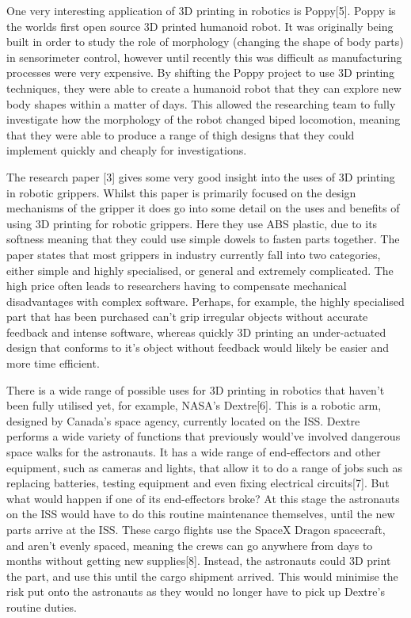 \documentclass{l4proj}
\begin{document}
One very interesting application of 3D printing in robotics is Poppy[5]. Poppy is the worlds first open source 3D printed humanoid robot. It was originally being built in order to study the role of morphology (changing the shape of body parts) in sensorimeter control, however until recently this was difficult as manufacturing processes were very expensive. By shifting the Poppy project to use 3D printing techniques, they were able to create a humanoid robot that they can explore new body shapes within a matter of days. This allowed the researching team to fully investigate how the morphology of the robot changed biped locomotion, meaning that they were able to produce a range of thigh designs that they could implement quickly and cheaply for investigations.

The research paper [3] gives some very good insight into the uses of 3D printing in robotic grippers. Whilst this paper is primarily focused on the design mechanisms of the gripper it does go into some detail on the uses and benefits of using 3D printing for robotic grippers. Here they use ABS plastic, due to its softness meaning that they could use simple dowels to fasten parts together. The paper states that most grippers in industry currently fall into two categories, either simple and highly specialised, or general and extremely complicated. The high price often leads to researchers having to compensate mechanical disadvantages with complex software. Perhaps, for example, the highly specialised part that has been purchased can't grip irregular objects without accurate feedback and intense software, whereas quickly 3D printing an under-actuated design that conforms to it's object without feedback would likely be easier and more time efficient. 

There is a wide range of possible uses for 3D printing in robotics that haven't been fully utilised yet, for example, NASA's Dextre[6]. This is a robotic arm, designed by Canada's space agency, currently located on the ISS. Dextre performs a wide variety of functions that previously would've involved dangerous space walks for the astronauts. It has a wide range of end-effectors and other equipment, such as cameras and lights, that allow it to do a range of jobs such as replacing batteries, testing equipment and even fixing electrical circuits[7]. But what would happen if one of its end-effectors broke? At this stage the astronauts on the ISS would have to do this routine maintenance themselves, until the new parts arrive at the ISS. These cargo flights use the SpaceX Dragon spacecraft, and aren't evenly spaced, meaning the crews can go anywhere from days to months without getting new supplies[8]. Instead, the astronauts could 3D print the part, and use this until the cargo shipment arrived. This would minimise the risk put onto the astronauts as they would no longer have to pick up Dextre's routine duties. 
\end{document}
